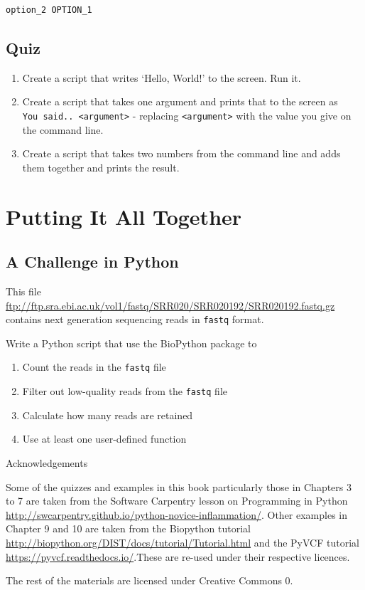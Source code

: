 \documentclass[]{book}
\providecommand{\tightlist}{%
  \setlength{\itemsep}{0pt}\setlength{\parskip}{0pt}}
\theoremstyle{definition}
\theoremstyle{definition}
\theoremstyle{definition}
\theoremstyle{remark}
\begin{document}
\begin{verbatim}
option_2 OPTION_1
\end{verbatim}

\hypertarget{quiz-6}{%
\section{Quiz}\label{quiz-6}}

\begin{enumerate}
\def\labelenumi{\arabic{enumi}.}
\tightlist
\item
  Create a script that writes `Hello, World!' to the screen. Run it.
\item
  Create a script that takes one argument and prints that to the screen
  as \texttt{You\ said..\ \textless{}argument\textgreater{}} - replacing
  \texttt{\textless{}argument\textgreater{}} with the value you give on
  the command line.
\item
  Create a script that takes two numbers from the command line and adds
  them together and prints the result.
\end{enumerate}

\hypertarget{putting-it-all-together}{%
\chapter{Putting It All Together}\label{putting-it-all-together}}

\hypertarget{a-challenge-in-python}{%
\section{A Challenge in Python}\label{a-challenge-in-python}}

This file
\href{}{ftp://ftp.sra.ebi.ac.uk/vol1/fastq/SRR020/SRR020192/SRR020192.fastq.gz}
contains next generation sequencing reads in \texttt{fastq} format.

Write a Python script that use the BioPython package to

\begin{enumerate}
\def\labelenumi{\arabic{enumi}.}
\tightlist
\item
  Count the reads in the \texttt{fastq} file
\item
  Filter out low-quality reads from the \texttt{fastq} file
\item
  Calculate how many reads are retained
\item
  Use at least one user-defined function
\end{enumerate}

Acknowledgements

Some of the quizzes and examples in this book particularly those in
Chapters 3 to 7 are taken from the Software Carpentry lesson on
Programming in Python
\href{}{http://swcarpentry.github.io/python-novice-inflammation/}. Other
examples in Chapter 9 and 10 are taken from the Biopython tutorial
\href{}{http://biopython.org/DIST/docs/tutorial/Tutorial.html} and the
PyVCF tutorial \href{}{https://pyvcf.readthedocs.io/}.These are re-used
under their respective licences.

The rest of the materials are licensed under Creative Commons 0.


\end{document}
